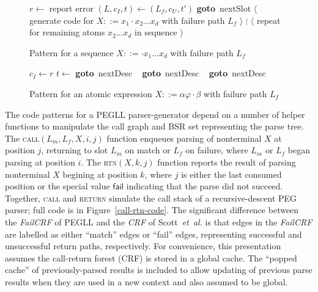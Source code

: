 \documentclass{article}
\makeatletter
\newcommand{\fail}{\mathsf{fail}}
\newcommand{\nl}{\mathord{!}}
\newcommand{\Goto}[1]{\textbf{goto}~#1}
\newcommand{\etal}{\textit{et~al.}\@}
\makeatother
\begin{document}
\begin{figure}
\caption[Sequence expression code pattern]{Pattern for a sequence $X ::= \cdot x_1 \ldots x_d$ with failure path $L_f$} \label{seq-expr-pattern}
\begin{algorithmic}
\State $r \gets$ 
	\State report error
	\State $(L, c_I, t) \gets (L_f, c_U, t')$ \Goto{nextSlot}
\EndIf
\State $\langle$ generate code for $X ::= x_1 \cdot x_2 \ldots x_d$ with failure path $L_f$ $\rangle$
\State $\vdots$
\State $\langle$ repeat for remaining atoms $x_2 \ldots x_d$ in sequence $\rangle$
\end{algorithmic}
\end{figure}

\begin{figure}
\caption[Atomic expression code patterns]{Pattern for an atomic expression $X ::= \alpha \varphi \cdot \beta$ with failure path $L_f$} \label{atom-expr-pattern}
\begin{algorithmic}
	\State {}
	\State $c_I \gets r$
	\State $t \gets$ 
\EndStaticCase{}
	\State {} \Goto{nextDesc}
\State ~
	\State {} \Goto{nextDesc}
\State ~
\StaticCase{$\varphi = \nl Y$}
	\State \Call{call}{$L_f, X ::= \alpha ~\nl Y \cdot \beta$, $Y$, $c_U$, $c_I$} \Goto{nextDesc}
\EndStaticCase{\textbf{case} $X ::= \alpha ~\nl Y \cdot \beta$:}
\end{algorithmic}
\end{figure}

The code patterns for a PEGLL parser-generator depend on a number of helper functions to manipulate the call graph and BSR set representing the parse tree. 
The \textsc{call}$(L_m, L_f, X, i, j)$ function enqueues parsing of nonterminal $X$ at position $j$, returning to slot $L_m$ on match or $L_f$ on failure, where $L_m$ or $L_f$ began parsing at position $i$. 
The \textsc{rtn}$(X, k, j)$ function reports the result of parsing nonterminal $X$ begining at position $k$, where $j$ is either the last consumed position or the special value $\fail$ indicating that the parse did not succeed. 
Together, \textsc{call} and \textsc{return} simulate the call stack of a recursive-descent PEG parser; full code is in Figure~\ref{call-rtn-code}. 
The significant difference between the \emph{FailCRF} of PEGLL and the \emph{CRF} of Scott~\etal \cite{SJvB19} is that edges in the \emph{FailCRF} are labelled as either ``match'' edges or ``fail'' edges, representing successful and unsuccessful return paths, respectively. 
For convenience, this presentation assumes the call-return forest (CRF) is stored in a global cache. 
The ``popped cache'' of previously-parsed results is included to allow updating of previous parse results when they are used in a new context and also assumed to be global.
\end{document}
